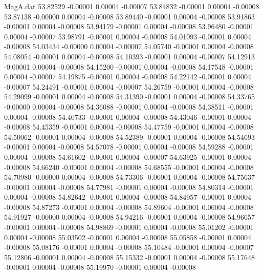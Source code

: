 \begin{filecontents}{MagA.dat}
  53.82529   -0.00001    0.00004   -0.00007
  53.84832   -0.00001    0.00004   -0.00008
  53.87138   -0.00000    0.00004   -0.00008
  53.89440   -0.00001    0.00004   -0.00008
  53.91863   -0.00001    0.00004   -0.00008
  53.94179   -0.00001    0.00004   -0.00008
  53.96480   -0.00001    0.00004   -0.00007
  53.98791   -0.00001    0.00004   -0.00008
  54.01093   -0.00001    0.00004   -0.00008
  54.03434   -0.00000    0.00004   -0.00007
  54.05740   -0.00001    0.00004   -0.00008
  54.08054   -0.00001    0.00004   -0.00008
  54.10393   -0.00001    0.00004   -0.00007
  54.12913   -0.00001    0.00004   -0.00008
  54.15200   -0.00001    0.00004   -0.00008
  54.17548   -0.00001    0.00004   -0.00007
  54.19875   -0.00001    0.00004   -0.00008
  54.22142   -0.00001    0.00004   -0.00007
  54.24491   -0.00001    0.00004   -0.00007
  54.26759   -0.00001    0.00004   -0.00008
  54.29099   -0.00001    0.00004   -0.00008
  54.31390   -0.00001    0.00004   -0.00008
  54.33765   -0.00000    0.00004   -0.00008
  54.36088   -0.00001    0.00004   -0.00008
  54.38511   -0.00001    0.00004   -0.00008
  54.40733   -0.00001    0.00004   -0.00008
  54.43046   -0.00001    0.00004   -0.00008
  54.45359   -0.00001    0.00004   -0.00008
  54.47759   -0.00001    0.00004   -0.00008
  54.50062   -0.00001    0.00004   -0.00008
  54.52389   -0.00001    0.00004   -0.00008
  54.54693   -0.00001    0.00004   -0.00008
  54.57078   -0.00001    0.00004   -0.00008
  54.59288   -0.00001    0.00004   -0.00008
  54.61602   -0.00001    0.00004   -0.00007
  54.63925   -0.00001    0.00004   -0.00008
  54.66240   -0.00001    0.00004   -0.00008
  54.68555   -0.00001    0.00004   -0.00008
  54.70980   -0.00000    0.00004   -0.00008
  54.73306   -0.00001    0.00004   -0.00008
  54.75637   -0.00001    0.00004   -0.00008
  54.77981   -0.00001    0.00004   -0.00008
  54.80314   -0.00001    0.00004   -0.00008
  54.82642   -0.00001    0.00004   -0.00008
  54.84957   -0.00001    0.00004   -0.00008
  54.87273   -0.00001    0.00004   -0.00008
  54.89604   -0.00001    0.00004   -0.00008
  54.91927   -0.00000    0.00004   -0.00008
  54.94216   -0.00001    0.00004   -0.00008
  54.96657   -0.00001    0.00004   -0.00008
  54.98869   -0.00001    0.00004   -0.00008
  55.01202   -0.00001    0.00004   -0.00008
  55.03502   -0.00001    0.00004   -0.00008
  55.05858   -0.00001    0.00004   -0.00008
  55.08176   -0.00001    0.00004   -0.00008
  55.10484   -0.00001    0.00004   -0.00007
  55.12806   -0.00001    0.00004   -0.00008
  55.15332   -0.00001    0.00004   -0.00008
  55.17648   -0.00001    0.00004   -0.00008
  55.19970   -0.00001    0.00004   -0.00008

\end{filecontents}
